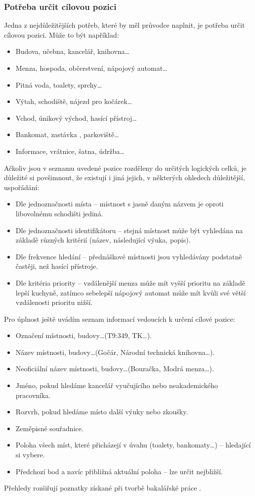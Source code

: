 \subsubsection{Potřeba určit cílovou pozici}
Jedna z nejdůležitějších potřeb, které by měl průvodce naplnit, je potřeba určit cílovou pozici. Může to být například:
\begin{itemize}
 \item Budova, učebna, kancelář, knihovna\dots
 \item Menza, hospoda, občerstvení, nápojový automat\dots
 \item Pitná voda, toalety, sprchy\dots
 \item Výtah, schodiště, nájezd pro kočárek\dots
 \item Vchod, únikový východ, hasící přístroj\dots
 \item Bankomat, zastávka , parkoviště\dots
 \item Informace, vrátnice, šatna, údržba\dots
\end{itemize}
Ačkoliv jsou v seznamu uvedené pozice rozděleny do určitých logických celků, je důležité si povšimnout, že existují i jiná jejich, v některých ohledech důležitější, uspořádání:
\begin{itemize}
 \item Dle jednoznačnosti místa -- místnost s jasně daným názvem je oproti libovolnému schodišti jediná.
 \item Dle jednoznačnosti identifikátoru -- stejná místnost může být vyhledána na základě různých kritérií (název, následující výuka, popis).
 \item Dle frekvence hledání -- přednáškové místnosti jsou vyhledávány podstatně častěji, než hasící přístroje.
 \item Dle kritéria priority -- vzdálenější menza může mít vyšší prioritu na základě lepší kuchyně, zatímco sebelepší nápojový automat může mít kvůli své větší vzdálenosti prioritu nižší.
\end{itemize}
Pro úplnost ještě uvádím seznam informací vedoucích k určení cílové pozice:
\begin{itemize}
\item Označení místnosti, budovy\dots (T9:349, TK\dots).
\item Název místnosti, budovy\dots (Gočár, Národní technická knihovna\dots).
\item Neoficiální název místnosti, budovy\dots (Bouračka, Modrá menza\dots).
\item Jméno, pokud hledáme kancelář vyučujícího nebo neakademického pracovníka.
\item Rozvrh, pokud hledáme místo další výuky nebo zkoušky.
\item Zeměpisné souřadnice.
\item Poloha všech míst, které přicházejí v úvahu (toalety, bankomaty\dots) -- hledající si vybere.
\item Předchozí bod a navíc přibližná aktuální poloha -- lze určit nejbližší.
\end{itemize}
Přehledy rozšiřují poznatky získané při tvorbě bakalářské práce \cite{Bakalarka}.

